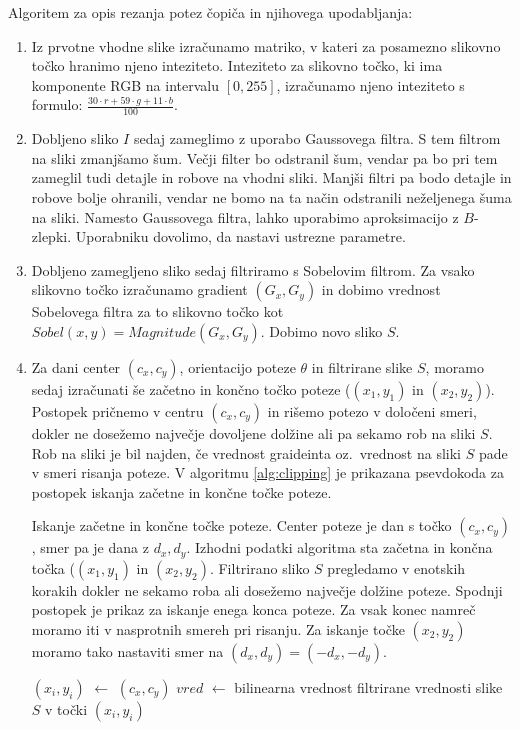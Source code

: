 Algoritem za opis rezanja potez čopiča in njihovega upodabljanja:
%
\begin{enumerate}
  \item Iz prvotne vhodne slike izračunamo matriko, v kateri za posamezno slikovno točko hranimo njeno inteziteto. Inteziteto za slikovno točko, ki ima komponente RGB na intervalu $[0, 255]$, izračunamo njeno inteziteto s formulo:
$\frac{30\cdot r + 59 \cdot g + 11\cdot b}{100}$.
  \item Dobljeno sliko $I$ sedaj zameglimo z uporabo Gaussovega filtra. S tem filtrom na sliki zmanjšamo šum. Večji filter bo odstranil šum, vendar pa bo pri tem zameglil tudi detajle in robove na vhodni sliki. Manjši filtri pa bodo detajle in robove bolje ohranili, vendar ne bomo na ta način odstranili neželjenega šuma na sliki. Namesto Gaussovega filtra, lahko uporabimo aproksimacijo z $B$-zlepki. Uporabniku dovolimo, da nastavi ustrezne parametre.
  \item Dobljeno zamegljeno sliko sedaj filtriramo s Sobelovim filtrom. Za vsako slikovno točko izračunamo gradient $(G_x, G_y)$ in dobimo vrednost Sobelovega filtra za to slikovno točko kot
$Sobel(x, y) = Magnitude(G_x, G_y)$.
Dobimo novo sliko $S$.
  \item Za dani center $(c_x, c_y)$, orientacijo poteze $\theta$ in filtrirane slike $S$, moramo sedaj izračunati še začetno in končno točko poteze ($(x_1, y_1)$ in $(x_2, y_2)$). Postopek pričnemo v centru $(c_x, c_y)$ in rišemo potezo v določeni smeri, dokler ne dosežemo največje dovoljene dolžine ali pa sekamo rob na sliki $S$. Rob na sliki je bil najden, če vrednost graideinta oz.\ vrednost na sliki $S$ pade v smeri risanja poteze. V algoritmu \ref{alg:clipping} je prikazana psevdokoda za postopek iskanja začetne in končne točke poteze.
%
\begin{algorithm}
  \caption{Iskanje začetne in končne točke poteze. Center poteze je dan s točko $(c_x, c_y)$, smer pa je dana z $d_x, d_y$. Izhodni podatki algoritma sta začetna in končna točka ($(x_1, y_1)$ in $(x_2, y_2)$. Filtrirano sliko $S$ pregledamo v enotskih korakih dokler ne sekamo roba ali dosežemo največje dolžine poteze. Spodnji postopek je prikaz za iskanje enega konca poteze. Za vsak konec namreč moramo iti v nasprotnih smereh pri risanju. Za iskanje točke $(x_2, y_2)$ moramo tako nastaviti smer na $(d_x, d_y) = (-d_x, -d_y)$.}
  \label{alg:clipping}
\begin{algorithmic}[1]
  \State $(x_i, y_i)$ $\leftarrow$ $(c_x, c_y)$
  \State $vred$ $\leftarrow$ bilinearna vrednost filtrirane vrednosti slike $S$ v točki $(x_i, y_i)$

\end{algorithmic}
\end{algorithm}
\end{enumerate}
